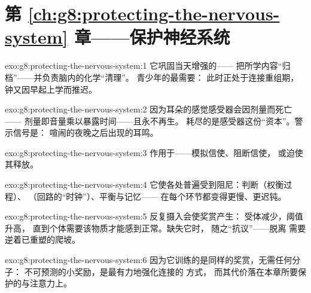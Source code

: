 \section*{第 \ref{ch:g8:protecting-the-nervous-system} 章——保护神经系统}

\begin{solution}{exo:g8:protecting-the-nervous-system:1}
它巩固当天增强的——
把所学内容“归档”——并负责脑内的化学“清理”。
青少年的最需要：
此时正处于连接重组期，
钟又因早起上学而推迟。
\end{solution}

\begin{solution}{exo:g8:protecting-the-nervous-system:2}
因为耳朵的感觉感受器会因剂量而死亡——
剂量即音量乘以暴露时间——且永不再生。
耗尽的是感受器这份“资本”。警示信号是：
喧闹的夜晚之后出现的耳鸣。
\end{solution}

\begin{solution}{exo:g8:protecting-the-nervous-system:3}
作用于——模拟信使、阻断信使，
或迫使其释放。
\end{solution}

\begin{solution}{exo:g8:protecting-the-nervous-system:4}
它使各处普遍受到阻尼：判断（权衡过程）、
（回路的“时钟”）、平衡与记忆——
在每个环节都变得更慢、更迟钝。
\end{solution}

\begin{solution}{exo:g8:protecting-the-nervous-system:5}
反复摄入会使奖赏产生：
受体减少，阈值升高，
直到个体需要该物质才能感到正常。缺失它时，
随之“抗议”——脱离
需要逆着已重塑的爬坡。
\end{solution}

\begin{solution}{exo:g8:protecting-the-nervous-system:6}
因为它训练的是同样的奖赏，无需任何分子：
不可预测的小奖励，是最有力地强化连接的
方式，
而其代价落在本章所要保护的与注意力上。
\end{solution}

